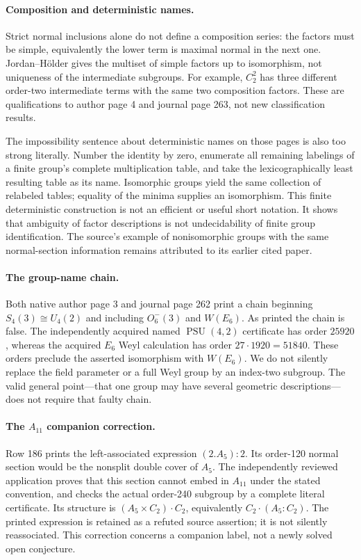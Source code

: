 \documentclass[11pt]{article}
\begin{document}
\paragraph{Composition and deterministic names.}
Strict normal inclusions alone do not define a composition series: the
factors must be simple, equivalently the lower term is maximal normal in
the next one. Jordan--H\"older gives the multiset of simple factors up to
isomorphism, not uniqueness of the intermediate subgroups. For example,
$C_2^2$ has three different order-two intermediate terms with the same two
composition factors. These are qualifications to author page 4 and journal
page 263, not new classification results.

The impossibility sentence about deterministic names on those pages is
also too strong literally. Number the identity by zero, enumerate all
remaining labelings of a finite group's complete multiplication table,
and take the lexicographically least resulting table as its name.
Isomorphic groups yield the same collection of relabeled tables; equality
of the minima supplies an isomorphism. This finite deterministic construction
is not an efficient or useful short notation. It shows that ambiguity of
factor descriptions is not undecidability of finite group identification.
The source's example of nonisomorphic groups with the same normal-section
information remains attributed to its earlier cited paper.

\paragraph{The group-name chain.}
Both native author page 3 and journal page 262 print a chain beginning
$S_4(3)\cong U_4(2)$ and including $O^-_6(3)$ and $W(E_6)$.
As printed the chain is false. The independently acquired named
$\operatorname{PSU}(4,2)$ certificate has order $25920$, whereas the acquired
$E_6$ Weyl calculation has order $27\cdot1920=51840$.
These orders preclude the asserted isomorphism with $W(E_6)$.
We do not silently replace the field parameter or a full Weyl group by
an index-two subgroup. The valid general point---that one group may have
several geometric descriptions---does not require that faulty chain.

\paragraph{The $A_{11}$ companion correction.}
Row 186 prints the left-associated expression $(2.A_5):2$.
Its order-120 normal section would be the nonsplit double cover of $A_5$.
The independently reviewed application proves that this section cannot
embed in $A_{11}$ under the stated convention, and checks the actual
order-240 subgroup by a complete literal certificate. Its structure is
$(A_5\times C_2)\mathbin{\cdot}C_2$, equivalently
$C_2\mathbin{\cdot}(A_5:C_2)$.
The printed expression is retained as a refuted source assertion; it is
not silently reassociated. This correction concerns a companion label,
not a newly solved open conjecture.
\end{document}
